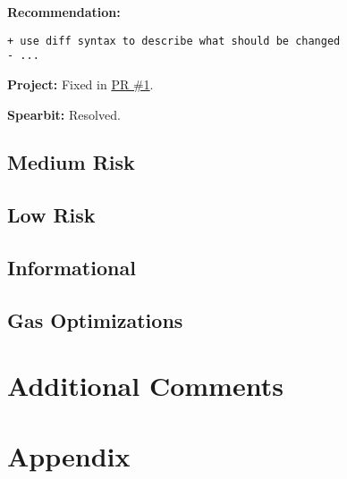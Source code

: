 \textbf{Recommendation:}

\begin{verbatim}
+ use diff syntax to describe what should be changed
- ...
\end{verbatim}

\textbf{Project:} Fixed in \href{Https://github.com/actuallink}{PR \#1}.

\textbf{Spearbit:} Resolved.

\subsection{Medium Risk}\label{medium-risk}

\subsection{Low Risk}\label{low-risk}

\subsection{Informational}\label{informational}

\subsection{Gas Optimizations}\label{gas-optimizations}

\section{Additional Comments}\label{additional-comments}

\section{Appendix}\label{appendix}

